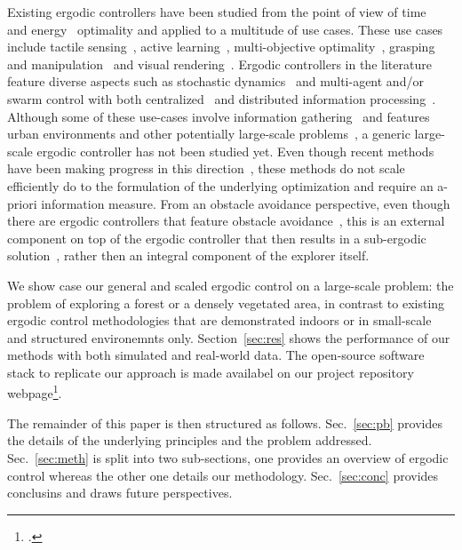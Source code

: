 \documentclass[letterpaper,10pt,conference,twoside]{IEEEtran}
\theoremstyle{definition}
\begin{document}
Existing ergodic controllers have been studied from the point of view of time~\cite{dong2023time} and energy~\cite{seewald2024energy,naveed2024eclares} optimality and applied to a multitude of use cases. These use cases include tactile sensing~\cite{abraham2017ergodic}, active learning~\cite{abraham2021ergodic}, multi-objective optimality~\cite{ren2023pareto,srinivasan2023multi}, grasping and manipulation~\cite{shetty2022ergodic,bilaloglu2023whole} and visual rendering~\cite{low2022drozbot,prabhakar2020autonomous}. Ergodic controllers in the literature feature diverse aspects such as stochastic dynamics~\cite{torre2016ergodic,ayvali2017ergodic} and multi-agent and/or swarm control with both centralized~\cite{seewald2024energy,rao2024learning} and distributed information processing~\cite{prabhakar2020ergodic,coffin2022multi}. Although some of these use-cases involve information gathering~\cite{dressel2018optimality} and features urban environments and other potentially large-scale problems~\cite{prabhakar2020ergodic,rao2023multi}, a generic large-scale ergodic controller has not been studied yet.
Even though recent methods have been making progress in this direction~\cite{whittemeyer2023bi,seewald2024energy,naveed2024eclares,dong2023time}, these methods do not scale efficiently do to the formulation of the underlying optimization and require an a-priori information measure. From an obstacle avoidance perspective, even though there are ergodic controllers that feature obstacle avoidance~\cite{lerch2023safety}, this is an external component on top of the ergodic controller that then results in a sub-ergodic solution~\cite{dong2023time}, rather then an integral component of the explorer itself.

We show case our general and scaled ergodic control on a large-scale problem: the problem of exploring a forest or a densely vegetated area, in contrast to existing ergodic control methodologies that are demonstrated indoors or in small-scale and structured environemnts only. Section~\ref{sec:res} shows the performance of our methods with both simulated and real-world data. 
The open-source software stack to replicate our approach is made availabel on our project repository webpage\footnote{.}.

The remainder of this paper is then structured as follows. Sec.~\ref{sec:pb} provides the details of the underlying principles and the problem addressed. Sec.~\ref{sec:meth} is split into two sub-sections, one provides an overview of ergodic control whereas the other one details our methodology. Sec.~\ref{sec:conc} provides conclusins and draws future perspectives.
\end{document}
